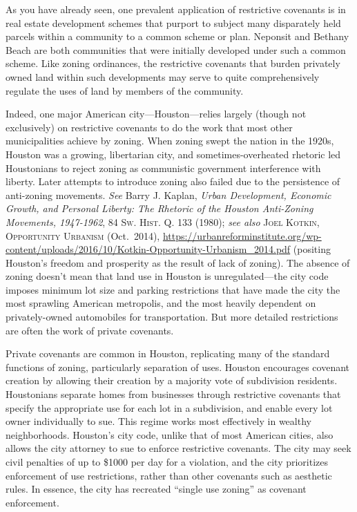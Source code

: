 
As you have already seen, one prevalent application of restrictive covenants is
in real estate development schemes that purport to subject many disparately held
parcels within a community to a common scheme or plan. Neponsit and Bethany
Beach are both communities that were initially developed under such a common
scheme. Like zoning ordinances, the restrictive covenants that burden privately
owned land within such developments may serve to quite comprehensively regulate
the uses of land by members of the community.

Indeed, one major American city---Houston---relies largely (though not
exclusively) on restrictive covenants to do the work that most other
municipalities achieve by zoning. When zoning swept the nation in the 1920s,
Houston was a growing, libertarian city, and sometimes-overheated rhetoric led
Houstonians to reject zoning as communistic government interference with
liberty. Later attempts to introduce zoning also failed due to the persistence
of anti-zoning movements. \textit{See} Barry J. Kaplan, \textit{Urban
Development, Economic Growth, and Personal Liberty: The Rhetoric of the Houston
Anti-Zoning Movements, 1947-1962}, 84 \textsc{Sw. Hist. Q.} 133 (1980);
\textit{see also} \textsc{Joel Kotkin, Opportunity Urbanism} (Oct.~2014),
\url{https://urbanreforminstitute.org/wp-content/uploads/2016/10/Kotkin-Opportunity-Urbanism_2014.pdf}
(positing
Houston's freedom and prosperity as the result of lack of zoning). The absence
of zoning doesn't mean that land use in Houston is unregulated---the city code
imposes minimum lot size and parking restrictions that have made the city the
most sprawling American metropolis, and the most heavily dependent on
privately-owned automobiles for transportation. But more detailed restrictions
are often the work of private covenants.

Private covenants are common in Houston, replicating many of the standard
functions of zoning, particularly separation of uses. Houston encourages
covenant creation by allowing their creation by a majority vote of subdivision
residents. Houstonians separate homes from businesses through restrictive
covenants that specify the appropriate use for each lot in a subdivision, and
enable every lot owner individually to sue. This regime works most effectively
in wealthy neighborhoods. Houston's city code, unlike that of most American
cities, also allows the city attorney to sue to enforce restrictive covenants.
The city may seek civil penalties of up to \$1000 per day for a violation, and
the city prioritizes enforcement of use restrictions, rather than other
covenants such as aesthetic rules. In essence, the city has recreated ``single
use zoning'' as covenant enforcement.

